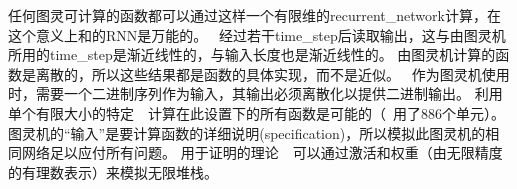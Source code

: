任何图灵可计算的函数都可以通过这样一个有限维的\gls{recurrent_network}计算，在这个意义上和的\gls{RNN}是万能的。
~经过若干\gls{time_step}后读取输出，这与由图灵机所用的\gls{time_step}是渐近线性的，与输入长度也是渐近线性的\citep{Siegelmann+Sontag-1991,Siegelmann-1995,Siegelmann+Sontag-1995,Hyotyniemi-1996}。
由图灵机计算的函数是离散的，所以这些结果都是函数的具体实现，而不是近似。
~作为图灵机使用时，需要一个二进制序列作为输入，其输出必须离散化以提供二进制输出。
利用单个有限大小的特定~~计算在此设置下的所有函数是可能的（~\cite{Siegelmann+Sontag-1995}用了886个单元）。
图灵机的``输入''是要计算函数的详细说明(specification)，所以模拟此图灵机的相同网络足以应付所有问题。
用于证明的理论~~可以通过激活和权重（由无限精度的有理数表示）来模拟无限堆栈。


